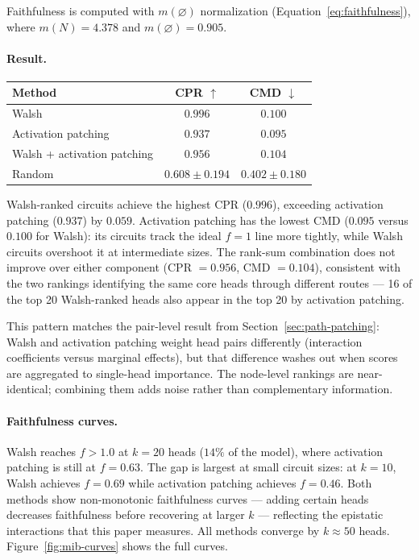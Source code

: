 Faithfulness is computed with $m(\varnothing)$ normalization
(Equation~\ref{eq:faithfulness}), where $m(N) = 4.378$ and
$m(\varnothing) = 0.905$.

\paragraph{Result.}

\medskip

\begin{tabular}{lcc}
\toprule
Method & CPR $\uparrow$ & CMD $\downarrow$ \\
\midrule
Walsh                              & $0.996$ & $0.100$ \\
Activation patching                & $0.937$ & $0.095$ \\
Walsh + activation patching        & $0.956$ & $0.104$ \\
Random                             & $0.608 \pm 0.194$ & $0.402 \pm 0.180$ \\
\bottomrule
\end{tabular}

\medskip

Walsh-ranked circuits achieve the highest CPR ($0.996$), exceeding
activation patching ($0.937$) by $0.059$. Activation patching has
the lowest CMD ($0.095$ versus $0.100$ for Walsh): its circuits
track the ideal $f = 1$ line more tightly, while Walsh circuits
overshoot it at intermediate sizes. The rank-sum combination does not
improve over either component (CPR $= 0.956$, CMD $= 0.104$),
consistent with the two rankings identifying the same core heads
through different routes --- 16 of the top 20 Walsh-ranked heads also
appear in the top 20 by activation patching.

This pattern matches the pair-level result from
Section~\ref{sec:path-patching}: Walsh and activation patching weight
head pairs differently (interaction coefficients versus marginal
effects), but that difference washes out when scores are aggregated to
single-head importance. The node-level rankings are near-identical;
combining them adds noise rather than complementary information.

\paragraph{Faithfulness curves.}

Walsh reaches $f > 1.0$ at $k = 20$ heads ($14\%$ of the model),
where activation patching is still at $f = 0.63$.
The gap is largest at small circuit sizes: at $k = 10$, Walsh achieves
$f = 0.69$ while activation patching achieves $f = 0.46$.
Both methods show non-monotonic faithfulness curves --- adding certain
heads decreases faithfulness before recovering at larger $k$ ---
reflecting the epistatic interactions that this paper measures.
All methods converge by $k \approx 50$ heads.
Figure~\ref{fig:mib-curves} shows the full curves.

